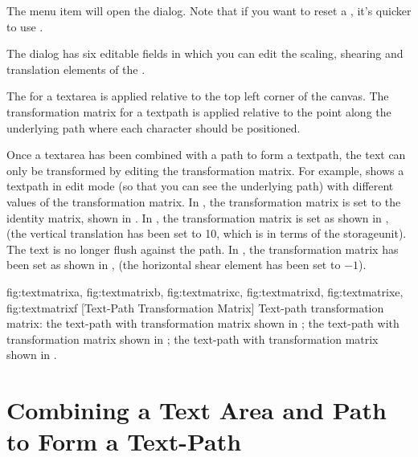 
The  menu item will open the 
dialog.
Note that if you want to reset a , 
it's quicker to use .


The  dialog has six editable fields in which
you can edit the scaling, shearing and translation elements of the
.

The  for a \gls*{textarea} is
applied relative to the top left corner of the \gls{canvas}. The
transformation matrix for a \gls{textpath} is applied relative to
the point along the underlying path where each character should be
positioned.

Once a \gls*{textarea} has been combined with a \gls{path} to form a
\gls{textpath}, the text can only be transformed by editing the
transformation matrix.  For example, 
shows a \gls*{textpath} in edit mode (so that you can see the
underlying path) with different values of the transformation matrix.
In , the transformation matrix is
set to the identity matrix, shown in
.  In
, the transformation matrix is set
as shown in , (the vertical
translation has been set to 10, which is in terms of the
\gls{storageunit}). The text is no longer flush against
the path. In , the transformation
matrix has been set as shown in ,
(the horizontal shear element has been set to $-1$).

{
  {fig:textmatrixa}{}{},
  {fig:textmatrixb}{}{},
  {fig:textmatrixc}{}{},
  {fig:textmatrixd}{}{},
  {fig:textmatrixe}{}{},
  {fig:textmatrixf}{}{}
}
[Text-Path Transformation Matrix]
{Text-path transformation matrix:
 the text-path with transformation matrix shown in
;
 the text-path with transformation matrix shown
in ;
 the text-path with transformation matrix
shown in .}

\section{Combining a Text Area and Path to Form a Text-Path}\label{sec:textpath}

